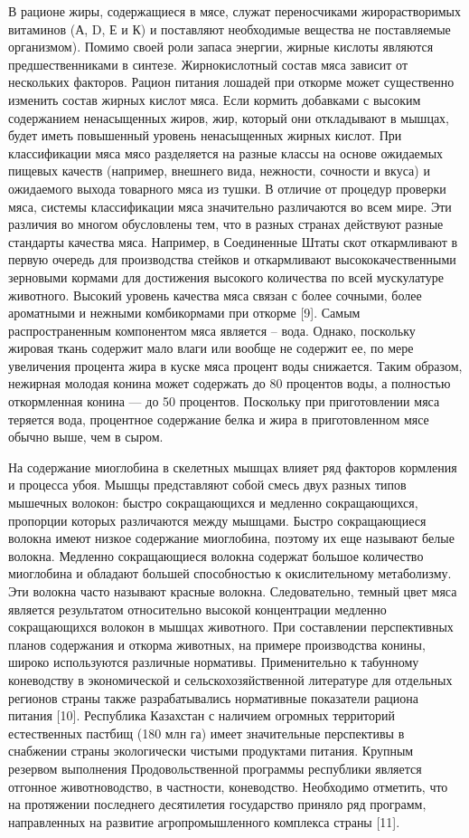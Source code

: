 В рационе жиры, содержащиеся в мясе, служат переносчиками
жирорастворимых витаминов (А, D, Е и К) и поставляют необходимые
вещества не поставляемые организмом). Помимо своей роли запаса энергии,
жирные кислоты являются предшественниками в синтезе. Жирнокислотный
состав мяса зависит от нескольких факторов. Рацион питания лошадей при
откорме может существенно изменить состав жирных кислот мяса. Если
кормить добавками с высоким содержанием ненасыщенных жиров, жир, который
они откладывают в мышцах, будет иметь повышенный уровень ненасыщенных
жирных кислот. При классификации мяса мясо разделяется на разные классы
на основе ожидаемых пищевых качеств (например, внешнего вида, нежности,
сочности и вкуса) и ожидаемого выхода товарного мяса из тушки. В отличие
от процедур проверки мяса, системы классификации мяса значительно
различаются во всем мире. Эти различия во многом обусловлены тем, что в
разных странах действуют разные стандарты качества мяса. Например, в
Соединенные Штаты скот откармливают в первую очередь для производства
стейков и откармливают высококачественными зерновыми кормами для
достижения высокого количества по всей мускулатуре животного. Высокий
уровень качества мяса связан с более сочными, более ароматными и нежными
комбикормами при откорме {[}9{]}. Самым распространенным компонентом
мяса является -- вода. Однако, поскольку жировая ткань содержит мало
влаги или вообще не содержит ее, по мере увеличения процента жира в
куске мяса процент воды снижается. Таким образом, нежирная молодая
конина может содержать до 80 процентов воды, а полностью откормленная
конина --- до 50 процентов. Поскольку при приготовлении мяса теряется
вода, процентное содержание белка и жира в приготовленном мясе обычно
выше, чем в сыром.

На содержание миоглобина в скелетных мышцах влияет ряд факторов
кормления и процесса убоя. Мышцы представляют собой смесь двух разных
типов мышечных волокон: быстро сокращающихся и медленно сокращающихся,
пропорции которых различаются между мышцами. Быстро сокращающиеся
волокна имеют низкое содержание миоглобина, поэтому их еще называют
белые волокна. Медленно сокращающиеся волокна содержат большое
количество миоглобина и обладают большей способностью к окислительному
метаболизму. Эти волокна часто называют красные волокна. Следовательно,
темный цвет мяса является результатом относительно высокой концентрации
медленно сокращающихся волокон в мышцах животного. При составлении
перспективных планов содержания и откорма животных, на примере
производства конины, широко используются различные нормативы.
Применительно к табунному коневодству в экономической и
сельскохозяйственной литературе для отдельных регионов страны также
разрабатывались нормативные показатели рациона питания {[}10{]}.
Республика Казахстан с наличием огромных территорий естественных пастбищ
(180 млн га) имеет значительные перспективы в снабжении страны
экологически чистыми продуктами питания. Крупным резервом выполнения
Продовольственной программы республики является отгонное животноводство,
в частности, коневодство. Необходимо отметить, что на протяжении
последнего десятилетия государство приняло ряд программ, направленных на
развитие агропромышленного комплекса страны {[}11{]}.

